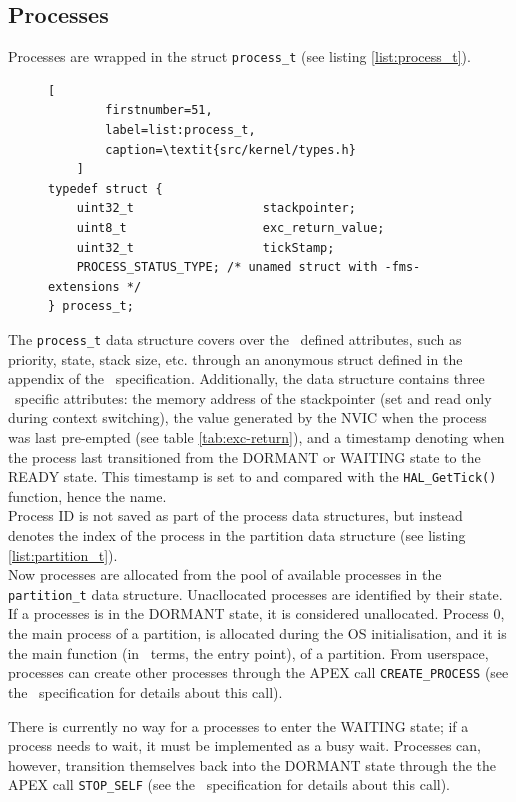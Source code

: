 \subsection{Processes}
Processes are wrapped in the struct \texttt{process\_t} (see listing
\ref{list:process_t}).
\begin{figure}
\lstset{
	tabsize=4
}
	\begin{lstlisting}[
		firstnumber=51,
		label=list:process_t,
		caption=\textit{src/kernel/types.h}
	]
typedef struct {
    uint32_t                  stackpointer;
    uint8_t                   exc_return_value;
    uint32_t				  tickStamp;
    PROCESS_STATUS_TYPE; /* unamed struct with -fms-extensions */
} process_t;
	\end{lstlisting}
\end{figure}
The \texttt{process\_t} data structure covers over the \arinc\ defined attributes,
such as priority, state, stack size, etc. through an anonymous struct defined in
the appendix of the \arinc\ specification\cite{arinc_page_165}. Additionally,
the data structure contains three \OSname\ specific attributes: the memory
address of the stackpointer (set and read only during context switching), the
\excreturn value generated by the NVIC when the process was last pre-empted (see
table \ref{tab:exc-return}), and a timestamp denoting when the process last
transitioned from the DORMANT or WAITING state to the READY state. This
timestamp is set to and compared with the \texttt{HAL\_GetTick()} function,
hence the name.\\
Process ID is not saved as part of the process data structures, but instead
denotes the index of the process in the partition data structure (see listing
\ref{list:partition_t}).\\

Now processes are allocated from the pool of available processes in the
\texttt{partition\_t} data structure. Unacllocated processes are identified by
their state. If a processes is in the DORMANT state, it is considered
unallocated. Process 0, the main process of a partition, is allocated during the
OS initialisation, and it is the main function (in \arinc\ terms, the entry
point), of a partition. From userspace, processes can create other processes
through the APEX call \texttt{CREATE\_PROCESS} (see the \arinc\ specification for
details about this call).

There is currently no way for a processes to enter the WAITING state; if a
process needs to wait, it must be implemented as a busy wait. Processes can,
however, transition themselves back into the DORMANT state through the the APEX
call \texttt{STOP\_SELF} (see the \arinc\ specification for details about this
call).

